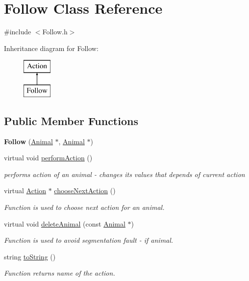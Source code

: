 \hypertarget{class_follow}{}\section{Follow Class Reference}
\label{class_follow}


{\ttfamily \#include $<$Follow.\+h$>$}

Inheritance diagram for Follow\+:\begin{figure}[H]
\begin{center}
\leavevmode
\includegraphics[height=2.000000cm]{class_follow}
\end{center}
\end{figure}
\subsection*{Public Member Functions}
\begin{DoxyCompactItemize}
\item 
\hypertarget{class_follow_a6d708596d789fd3845a0c16adf045816}{}{\bfseries Follow} (\hyperlink{class_animal}{Animal} $\ast$, \hyperlink{class_animal}{Animal} $\ast$)\label{class_follow_a6d708596d789fd3845a0c16adf045816}

\item 
virtual void \hyperlink{class_follow_aefc092266387bcddd87aa334c90afcba}{perform\+Action} ()
\begin{DoxyCompactList}\small\item\em performs action of an animal -\/ changes it\textquotesingle{}s values that depends of current action \end{DoxyCompactList}\item 
virtual \hyperlink{class_action}{Action} $\ast$ \hyperlink{class_follow_a32e0774402c8e8885bacb78aefd7abf8}{choose\+Next\+Action} ()
\begin{DoxyCompactList}\small\item\em Function is used to choose next action for an animal. \end{DoxyCompactList}\item 
virtual void \hyperlink{class_follow_a2800c1fe0222144e791750699af6001e}{delete\+Animal} (const \hyperlink{class_animal}{Animal} $\ast$)
\begin{DoxyCompactList}\small\item\em Function is used to avoid segmentation fault -\/ if animal. \end{DoxyCompactList}\item 
string \hyperlink{class_follow_aeec724a51b1a92569c0f3bbeef9b0e34}{to\+String} ()
\begin{DoxyCompactList}\small\item\em Function returns name of the action. \end{DoxyCompactList}\end{DoxyCompactItemize}
